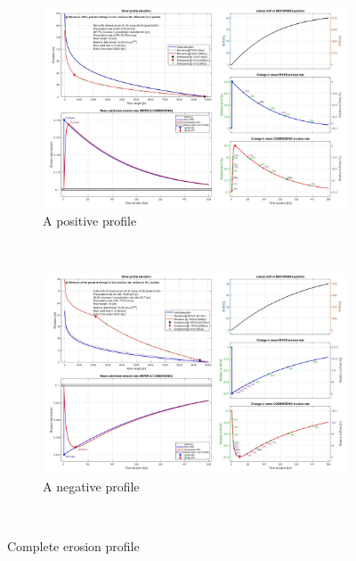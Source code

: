 \documentclass[11pt,a4paper,titlepage]{report}
\begin{document}
\begin{figure}[H]
    \centering
    \begin{subfigure}[H]{0.8\textwidth}
        \includegraphics[width=\textwidth]{profile_pmax.jpg}
        \caption{A positive profile}
        \label{fig:ep+}
    \end{subfigure}\\
    \begin{subfigure}[H]{0.8\textwidth}
        \includegraphics[width=\textwidth]{profile_nmin.jpg}
        \caption{A negative profile}
        \label{fig:ep-}
    \end{subfigure}\\
    \caption[Complete erosion profile]{Complete erosion profile}
    \label{fig:ep}    
\end{figure}
\end{document}
